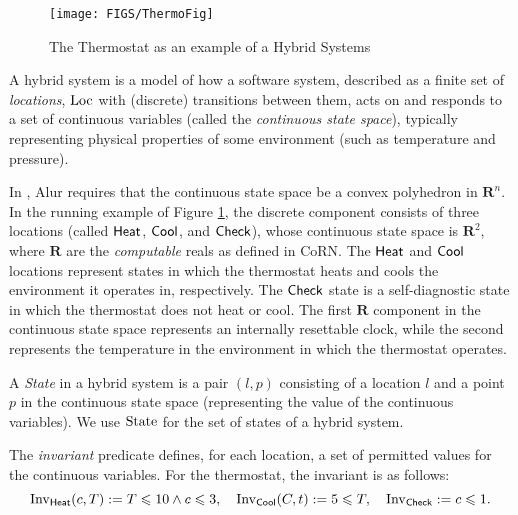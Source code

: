 \documentclass[runningheads]{llncs}
\renewcommand{\leq}{\leqslant}
\newcommand{\IR}{{\mathbf R}}
\newcommand{\Heat}{{\sf Heat}}
\newcommand{\Cool}{{\sf Cool}}
\newcommand{\Chec}{{\sf Check}}
\newcommand{\Loc}{{\rm Loc}}
\newcommand{\State}{{\rm State}}
\newcommand{\Inv}{{\rm Inv}}
\begin{document}
\begin{center}
\begin{figure}[htb!]
\begin{center}
    \texttt{[image: FIGS/ThermoFig]}
\end{center}
\caption{The Thermostat as an example of a Hybrid Systems \label{fig:thermostat}}
\end{figure}
\end{center}

A hybrid system is a model of how a software system, described as a
finite set of \emph{locations}, $\Loc$ 
with (discrete) transitions between them, acts
on and responds to a set of continuous variables (called the
\emph{continuous state space}), typically representing physical
properties of some environment (such as temperature and pressure).

In \cite{alur}, Alur requires that the continuous state space be a
convex polyhedron in $\IR^ n$. 
In the running example of Figure \ref{fig:thermostat},
the discrete component consists of three locations (called $\Heat$, $\Cool$,
and $\Chec$), whose continuous state space is $\IR^2$,
where $\IR$ are the \emph{computable} reals as defined in CoRN. 
The $\Heat$ and $\Cool$ locations represent states in which the
thermostat heats and cools the environment it operates in,
respectively. The $\Chec$ state is a self-diagnostic state in which
the thermostat does not heat or cool. The first $\IR$ component in the
continuous state space represents an internally resettable clock,
while the second represents the temperature in the environment in
which the thermostat operates.

A \emph{State} in a hybrid system is a pair $(l, p)$ consisting of a
location $l$ and a point $p$ in the continuous state space
(representing the value of the continuous variables). We use $\State$
for the set of states of a hybrid system.

The {\em invariant\/} predicate defines, for each location, a set of
permitted values for the continuous variables. 
For the thermostat, the invariant is as follows: $$\Inv_{\Heat}(c,T) := T\leq 10\wedge c\leq 3,\quad \Inv_{\Cool}(C,t) := 5 \leq T,\quad \Inv_{\Chec} := c\leq 1.$$
\end{document}

